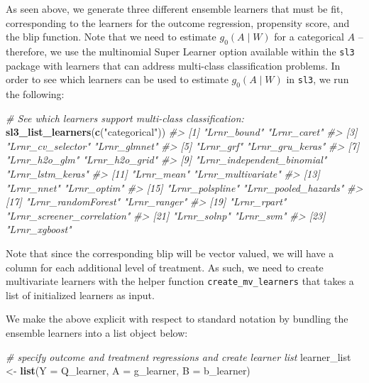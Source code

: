 \documentclass[12pt, krantz2,]{book}
\newenvironment{Shaded}{\begin{snugshade}}{\end{snugshade}}
\newcommand{\CommentTok}[1]{\textcolor[rgb]{0.56,0.35,0.01}{\textit{#1}}}
\newcommand{\DataTypeTok}[1]{\textcolor[rgb]{0.13,0.29,0.53}{#1}}
\newcommand{\KeywordTok}[1]{\textcolor[rgb]{0.13,0.29,0.53}{\textbf{#1}}}
\newcommand{\NormalTok}[1]{#1}
\newcommand{\StringTok}[1]{\textcolor[rgb]{0.31,0.60,0.02}{#1}}
\theoremstyle{definition}
\theoremstyle{definition}
\theoremstyle{definition}
\newcommand{\1}{\mathbbm{1}}
\begin{document}
As seen above, we generate three different ensemble learners that must be fit,
corresponding to the learners for the outcome regression, propensity score, and
the blip function. Note that we need to estimate \(g_0(A \mid W)\) for a
categorical \(A\) -- therefore, we use the multinomial Super Learner option
available within the \texttt{sl3} package with learners that can address multi-class
classification problems. In order to see which learners can be used to estimate
\(g_0(A \mid W)\) in \texttt{sl3}, we run the following:

\begin{Shaded}
\begin{Highlighting}[]
\CommentTok{# See which learners support multi-class classification:}
\KeywordTok{sl3_list_learners}\NormalTok{(}\KeywordTok{c}\NormalTok{(}\StringTok{"categorical"}\NormalTok{))}
\CommentTok{#>  [1] "Lrnr_bound"                "Lrnr_caret"               }
\CommentTok{#>  [3] "Lrnr_cv_selector"          "Lrnr_glmnet"              }
\CommentTok{#>  [5] "Lrnr_grf"                  "Lrnr_gru_keras"           }
\CommentTok{#>  [7] "Lrnr_h2o_glm"              "Lrnr_h2o_grid"            }
\CommentTok{#>  [9] "Lrnr_independent_binomial" "Lrnr_lstm_keras"          }
\CommentTok{#> [11] "Lrnr_mean"                 "Lrnr_multivariate"        }
\CommentTok{#> [13] "Lrnr_nnet"                 "Lrnr_optim"               }
\CommentTok{#> [15] "Lrnr_polspline"            "Lrnr_pooled_hazards"      }
\CommentTok{#> [17] "Lrnr_randomForest"         "Lrnr_ranger"              }
\CommentTok{#> [19] "Lrnr_rpart"                "Lrnr_screener_correlation"}
\CommentTok{#> [21] "Lrnr_solnp"                "Lrnr_svm"                 }
\CommentTok{#> [23] "Lrnr_xgboost"}
\end{Highlighting}
\end{Shaded}

Note that since the corresponding blip will be vector valued, we will have a
column for each additional level of treatment. As such, we need to create
multivariate learners with the helper function \texttt{create\_mv\_learners} that takes a
list of initialized learners as input.

We make the above explicit with respect to standard notation by bundling the
ensemble learners into a list object below:

\begin{Shaded}
\begin{Highlighting}[]
\CommentTok{# specify outcome and treatment regressions and create learner list}
\NormalTok{learner_list <-}\StringTok{ }\KeywordTok{list}\NormalTok{(}\DataTypeTok{Y =}\NormalTok{ Q_learner, }\DataTypeTok{A =}\NormalTok{ g_learner, }\DataTypeTok{B =}\NormalTok{ b_learner)}
\end{Highlighting}
\end{Shaded}
\end{document}
